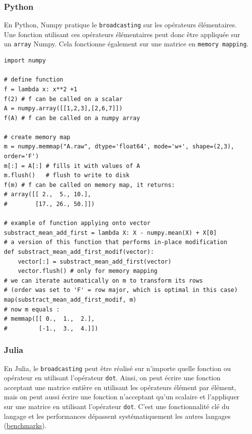 \subsubsection{Python}

En Python, Numpy pratique le \verb|broadcasting| sur les opérateurs élémentaires. Une fonction utilisant ces opérateurs élémentaires peut donc être appliquée sur un \verb|array| Numpy. Cela fonctionne également sur une matrice en \verb|memory mapping|.

\pythonstyle
\begin{lstlisting}
import numpy

# define function
f = lambda x: x**2 +1
f(2) # f can be called on a scalar
A = numpy.array([[1,2,3],[2,6,7]])
f(A) # f can be called on a numpy array

# create memory map
m = numpy.memmap("A.raw", dtype='float64', mode='w+', shape=(2,3), order='F')
m[:] = A[:] # fills it with values of A
m.flush()	# flush to write to disk
f(m) # f can be called on memory map, it returns:
# array([[ 2.,  5., 10.],
#        [17., 26., 50.]])

# example of function applying onto vector
substract_mean_add_first = lambda X: X - numpy.mean(X) + X[0]
# a version of this function that performs in-place modification
def substract_mean_add_first_modif(vector):
	vector[:] = substract_mean_add_first(vector)
	vector.flush() # only for memory mapping
# we can iterate automatically on m to transform its rows
# (order was set to 'F' = row major, which is optimal in this case)
map(substract_mean_add_first_modif, m)
# now m equals :
# memmap([[ 0.,  1.,  2.],
#         [-1.,  3.,  4.]])
\end{lstlisting}

\subsubsection{Julia}

En Julia, le \verb|broadcasting| peut être réalisé sur n'importe quelle fonction ou opérateur en utilisant l'opérateur \verb|dot|. Ainsi, on peut écrire une fonction acceptant une matrice entière en utilisant les opérateurs élément par élément, mais on peut aussi écrire une fonction n'acceptant qu'un scalaire et l'appliquer sur une matrice en utilisant l'opérateur \verb|dot|. C'est une fonctionnalité clé du langage et les performances dépassent systématiquement les autres langages (\href{https://julialang.org/benchmarks/}{benchmarks}).

